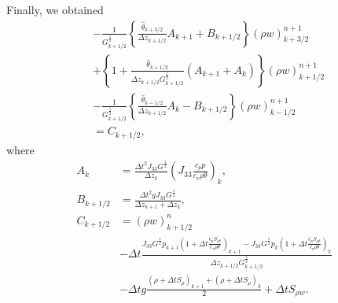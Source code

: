 Finally, we obtained
\begin{align}
  &-\frac{1}{G^{\frac{1}{2}}_{k+1/2}}\left\{
    \frac{\hat{\theta}_{k+3/2}}{\Delta z_{k+1/2}}A_{k+1} + B_{k+1/2}
  \right\} (\rho w)_{k+3/2}^{n+1} \\
  &+ \left\{ 1 + \frac{\hat{\theta}_{k+1/2}}{\Delta z_{k+1/2} G^{\frac{1}{2}}_{k+1/2}}(A_{k+1} + A_k)  \right\} (\rho w)_{k+1/2}^{n+1} \\
  &- \frac{1}{G^{\frac{1}{2}}_{k+1/2}}\left\{
  \frac{\hat{\theta}_{k-1/2}}{\Delta z_{k+1/2}}A_k - B_{k+1/2}
  \right\} (\rho w)_{k-1/2}^{n+1} \\
  &= C_{k+1/2},
\end{align}
where
\begin{align}
  A_k &= \frac{\Delta t^2 J_{33}G^{\frac{1}{2}} }{\Delta z_k}\left(J_{33}\frac{c_pp}{c_v\rho\theta}\right)_k, \\
  B_{k+1/2} &= \frac{\Delta t^2 g J_{33}G^{\frac{1}{2}}}{\Delta z_{k+1}+\Delta z_k}, \\
  C_{k+1/2} &=
  (\rho w)_{k+1/2}^n \nonumber \\&
  -\Delta t\frac{
  J_{33}G^{\frac{1}{2}}p_{k+1}\left(1+\Delta t\frac{c_pS_{\rho\theta}}{c_v\rho\theta}\right)_{k+1}
  - J_{33}G^{\frac{1}{2}} p_k\left(1+\Delta t\frac{c_pS_{\rho\theta}}{c_v\rho\theta}\right)_k}{\Delta z_{k+1/2} G^{\frac{1}{2}}_{k+1/2}} \nonumber\\ &
  -\Delta t g \frac{(\rho+\Delta t S_\rho)_{k+1}+(\rho+\Delta t S_\rho)_k}{2} + \Delta t S_{\rho w}.
\end{align}
